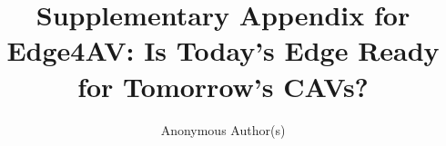 \documentclass[sigconf,10pt,anonymous,balance=false]{acmart}
\title{Supplementary Appendix for Edge4AV: Is Today's Edge Ready for
Tomorrow's CAVs?}
\author{Anonymous Author(s)}
\affiliation{%
  \institution{Anonymous Institution}
  \country{}}
\begin{document}
\maketitle

\appendix


\FloatBarrier


\end{document}
